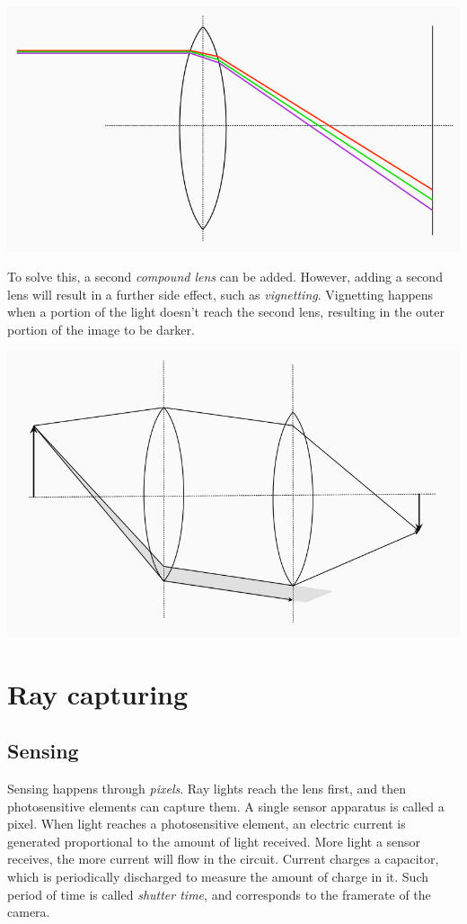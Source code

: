 \documentclass[10pt]{report}
\begin{document}
\begin{center}
\includegraphics[width=.9\linewidth]{./pics/visio/chromatic-aberration.jpg}
\end{center}

To solve this, a second \emph{compound lens} can be added. However, adding a
second lens will result in a further side effect, such as \emph{vignetting}.
Vignetting happens when a portion of the light doesn't reach the second
lens, resulting in the outer portion of the image to be darker.

\begin{center}
\includegraphics[width=.9\linewidth]{./pics/visio/vignetting.jpg}
\end{center}

\section{Ray capturing}
\label{ray-capturing}
\subsection{Sensing}
\label{sensing}
Sensing happens through \emph{pixels}. Ray lights reach the lens first, and
then photosensitive elements can capture them. A single sensor apparatus
is called a pixel. When light reaches a photosensitive element, an
electric current is generated proportional to the amount of light
received. More light a sensor receives, the more current will flow in
the circuit. Current charges a capacitor, which is periodically
discharged to measure the amount of charge in it. Such period of time is
called \emph{shutter time}, and corresponds to the framerate of the camera.
\end{document}
